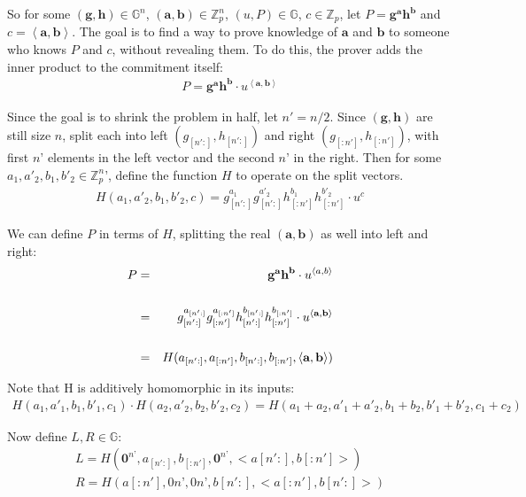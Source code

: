 \documentclass{article}
\begin{document}
So for some $(\textbf{g}, \textbf{h}) \in \mathbb{G}^n$, $(\textbf{a}, \textbf{b}) \in \mathbb{Z}_p^n$, $(u, P) \in \mathbb{G}$, $c \in \mathbb{Z}_p$, let $P = \textbf{g}^\textbf{a} \textbf{h}^\textbf{b}$ and $c = \left<\textbf{a}, \textbf{b}\right>$.  The goal is to find a way to prove knowledge of $\textbf{a}$ and $\textbf{b}$ to someone who knows $P$ and $c$, without revealing them.  To do this, the prover adds the inner product to the commitment itself:
\begin{eqnarray}
  P = \textbf{g}^\textbf{a} \textbf{h}^\textbf{b} \cdot u^{\left<\textbf{a}, \textbf{b}\right>}
\end{eqnarray}

Since the goal is to shrink the problem in half, let $n' = n/2$.  Since $(\textbf{g}, \textbf{h})$ are still size $n$, split each into left $(g_{[n':]}, h_{[n':]})$ and right $(g_{[:n']}, h_{[:n']})$, with first $n’$ elements in the left vector and the second $n’$ in the right.  Then for some $a_1, a'_2, b_1, b'_2 \in \mathbb{Z}_p^n’$, define the function $H$ to operate on the split vectors. 
\begin{eqnarray}
  H(a_1, a'_2, b_1, b'_2, c) = g_{[n':]}^{a_1} g_{[n':]}^{a'_2} h_{[:n']}^{b_1} h_{[:n']}^{b'_2} \cdot u^c
\end{eqnarray}

We can define $P$ in terms of $H$, splitting the real $(\textbf{a}, \textbf{b})$ as well into left and right:
\begin{eqnarray}
  P &=& \textbf{g}^{\textbf{a}} \textbf{h}^{\textbf{b}} \cdot u^{\left<a, b\right>}\\
  \cr &=& g_{[n':]}^{a_{[n':]}} g_{[:n']}^{a_{[:n']}} h_{[n':]}^{b_{[n':]}} h_{[:n']}^{b_{[:n']}} \cdot u^{\left<\textbf{a}, \textbf{b}\right>}\\
  \cr &=& H(a_{[n':]}, a_{[:n']}, b_{[n':]}, b_{[:n']}, \left<\textbf{a}, \textbf{b}\right>)
\end{eqnarray}

Note that H is additively homomorphic in its inputs:
\begin{eqnarray}
  H(a_1, a'_1, b_1, b'_1, c_1) \cdot H(a_2, a'_2, b_2, b'_2, c_2) = H(a_1 + a_2, a'_1 + a'_2, b_1 + b_2, b'_1 + b'_2, c_1 + c_2)
\end{eqnarray}

Now define $L, R \in \mathbb{G}$:
\begin{eqnarray}
  L = H(\textbf{0}^{n’}, a_{[n':]}, b_{[:n']}, \textbf{0}^{n’}, <a{[n':]}, b{[:n']}>)\\
  R = H(a{[:n']}, 0n’, 0n’, b{[n':]}, <a{[:n']}, b{[n':]}>)
\end{eqnarray}
\end{document}
